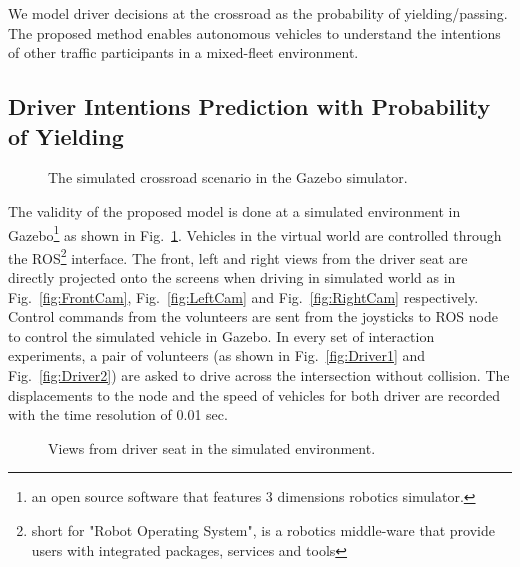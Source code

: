 We model driver decisions at the crossroad as the probability of yielding/passing. The proposed method enables autonomous vehicles to understand the intentions of other traffic participants in a mixed-fleet environment.




\subsection{Driver Intentions Prediction with Probability of Yielding}
\label{subsec:ValidatePOY}


\begin{figure}[htbp!]
\begin{center}
\end{center}
\caption{The simulated crossroad scenario in the Gazebo simulator.}
\label{fig:GazeboCrossroad} 
\end{figure}

The validity of the proposed model is done at a simulated environment in Gazebo\footnote{an open source software that features 3 dimensions robotics simulator.} as shown in Fig.~\ref{fig:GazeboCrossroad}. Vehicles in the virtual world are controlled through the ROS\footnote{short for "Robot Operating System", is a robotics middle-ware that provide users with integrated packages, services and tools} interface. The front, left and right views from the driver seat are directly projected onto the screens when driving in simulated world as in Fig.~\ref{fig:FrontCam}, Fig.~\ref{fig:LeftCam} and Fig.~\ref{fig:RightCam} respectively. Control commands from the volunteers are sent from the joysticks to ROS node to control the simulated vehicle in Gazebo. In every set of interaction experiments, a pair of volunteers (as shown in Fig.~\ref{fig:Driver1} and Fig.~\ref{fig:Driver2}) are asked to drive across the intersection without collision. The displacements to the node and the speed of vehicles for both driver are recorded with the time resolution of 0.01 sec. 

\begin{figure}[htbp!]
    \centering
    \hfill
    \hfill
    \hfill
    \caption{Views from driver seat in the simulated environment.} \label{fig:AllCam}
\end{figure}


